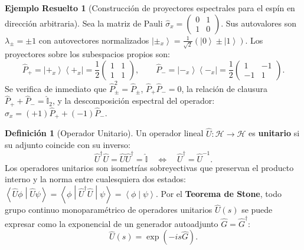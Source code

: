 \documentclass[11pt,a4paper,twoside]{report}
\theoremstyle{definition}
\newtheorem{definicion}{Definición}[chapter]
\newtheorem{ejemplo}{Ejemplo Resuelto}[chapter]
\theoremstyle{plain}
\theoremstyle{remark}
\newcommand{\ket}[1]{\left| #1 \right\rangle}
\newcommand{\braket}[2]{\left\langle #1 \middle| #2 \right\rangle}
\newcommand{\ketbra}[2]{\left| #1 \right\rangle\!\left\langle #2 \right|}
\newcommand{\mel}[3]{\left\langle #1 \middle| #2 \middle| #3 \right\rangle}
\newcommand{\Hil}{\mathcal{H}}
\newcommand{\op}[1]{\hat{#1}}
\newcommand{\ident}{\hat{\mathbb{I}}}
\begin{document}
\begin{ejemplo}[Construcción de proyectores espectrales para el espín en dirección arbitraria]
Sea la matriz de Pauli $\op{\sigma}_x = \begin{pmatrix} 0 & 1 \\ 1 & 0 \end{pmatrix}$. Sus autovalores son $\lambda_\pm = \pm 1$ con autovectores normalizados $\ket{\pm_x} = \frac{1}{\sqrt{2}}(\ket{0} \pm \ket{1})$. Los proyectores sobre los subespacios propios son:
\begin{equation}
    \op{P}_+ = \ketbra{+_x}{+_x} = \frac{1}{2}\begin{pmatrix} 1 & 1 \\ 1 & 1 \end{pmatrix}, \qquad \op{P}_- = \ketbra{-_x}{-_x} = \frac{1}{2}\begin{pmatrix} 1 & -1 \\ -1 & 1 \end{pmatrix}.
\end{equation}
Se verifica de inmediato que $\op{P}_\pm^2 = \op{P}_\pm$, $\op{P}_+\op{P}_- = 0$, la relación de clausura $\op{P}_+ + \op{P}_- = \ident_2$, y la descomposición espectral del operador: $\op{\sigma}_x = (+1)\op{P}_+ + (-1)\op{P}_-$.
\end{ejemplo}

\begin{definicion}[Operador Unitario]
Un operador lineal $\op{U}: \Hil \to \Hil$ es \textbf{unitario} si su adjunto coincide con su inverso:
\begin{equation}
    \op{U}^\dagger \op{U} = \op{U} \op{U}^\dagger = \ident \quad \Longleftrightarrow \quad \op{U}^\dagger = \op{U}^{-1}.
\end{equation}
Los operadores unitarios son isometrías sobreyectivas que preservan el producto interno y la norma entre cualesquiera dos estados: $\braket{\op{U}\phi}{\op{U}\psi} = \mel{\phi}{\op{U}^\dagger \op{U}}{\psi} = \braket{\phi}{\psi}$. Por el \textbf{Teorema de Stone}, todo grupo continuo monoparamétrico de operadores unitarios $\op{U}(s)$ se puede expresar como la exponencial de un generador autoadjunto $\op{G} = \op{G}^\dagger$:
\begin{equation}
    \op{U}(s) = \exp(-i s \op{G}).
\end{equation}
\end{definicion}
\end{document}
